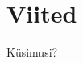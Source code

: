 \section{Viited}

\begin{frame}[t,allowframebreaks,]
  	
	 

\end{frame}

\begin{frame}[plain]
	\begin{center}Küsimusi?\end{center}
\end{frame}


